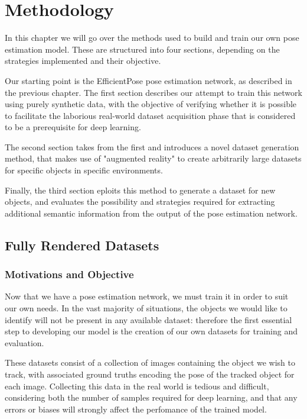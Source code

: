 \chapter{Methodology}

In this chapter we will go over the methods used to build and train our own pose estimation model. These are structured into four sections, depending on the strategies implemented and their objective.

Our starting point is the EfficientPose pose estimation network, as described in the previous chapter. The first section describes our attempt to train this network using purely synthetic data, with the objective of verifying whether it is possible to facilitate the laborious real-world dataset acquisition phase that is considered to be a prerequisite for deep learning.

The second section takes from the first and introduces a novel dataset generation method, that makes use of "augmented reality" to create arbitrarily large datasets for specific objects in specific environments.

Finally, the third section eploits this method to generate a dataset for new objects, and evaluates the possibility and strategies required for extracting additional semantic information from the output of the pose estimation network.

\section{Fully Rendered Datasets}

\subsection{Motivations and Objective}

Now that we have a pose estimation network, we must train it in order to suit our own needs. In the vast majority of situations, the objects we would like to identify will not be present in any available dataset: therefore the first essential step to developing our model is the creation of our own datasets for training and evaluation.

These datasets consist of a collection of images containing the object we wish to track, with associated ground truths encoding the pose of the tracked object for each image. Collecting this data in the real world is tedious and difficult, considering both the number of samples required for deep learning, and that any errors or biases will strongly affect the perfomance of the trained model.


